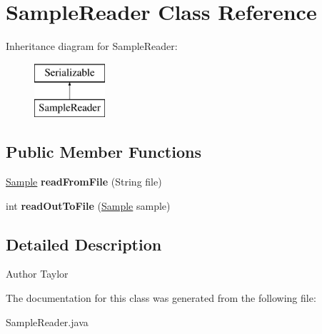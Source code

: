 \hypertarget{classSampleReader}{\section{Sample\-Reader Class Reference}
\label{classSampleReader}
}
Inheritance diagram for Sample\-Reader\-:\begin{figure}[H]
\begin{center}
\leavevmode
\includegraphics[height=2.000000cm]{classSampleReader}
\end{center}
\end{figure}
\subsection*{Public Member Functions}
\begin{DoxyCompactItemize}
\item 
\hypertarget{classSampleReader_af60a9629ef51bde1f99f61f980fce2c4}{\hyperlink{classSample}{Sample} {\bfseries read\-From\-File} (String file)}\label{classSampleReader_af60a9629ef51bde1f99f61f980fce2c4}

\item 
\hypertarget{classSampleReader_a5c2d1e125397a6d69448ded32878471a}{int {\bfseries read\-Out\-To\-File} (\hyperlink{classSample}{Sample} sample)}\label{classSampleReader_a5c2d1e125397a6d69448ded32878471a}

\end{DoxyCompactItemize}


\subsection{Detailed Description}
\begin{DoxyAuthor}{Author}
Taylor 
\end{DoxyAuthor}


The documentation for this class was generated from the following file\-:\begin{DoxyCompactItemize}
\item 
Sample\-Reader.\-java\end{DoxyCompactItemize}
